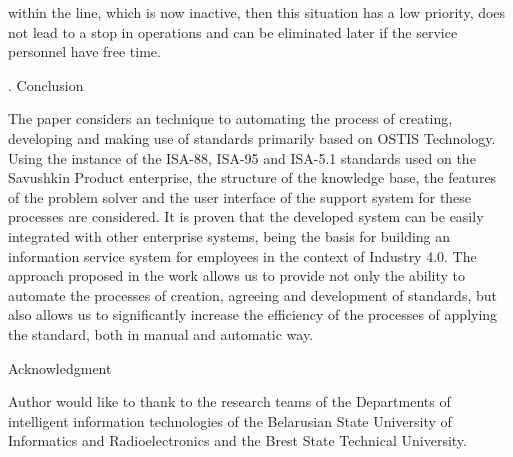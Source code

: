 \documentclass[twocolumn]{scndocument}
\begin{document}
within the line, which is now inactive, then this situation
has a low priority, does not lead to a stop in operations
and can be eliminated later if the service personnel have
free time.

\singlespacing
\begin{center}
\MakeUppercase{}. Conclusion  
\end{center}

The paper considers an technique to automating the
process of creating, developing and making use of standards primarily based on OSTIS Technology. Using the
instance of the ISA-88, ISA-95 and ISA-5.1 standards
used on the Savushkin Product enterprise, the structure
of the knowledge base, the features of the problem solver
and the user interface of the support system for these
processes are considered. It is proven that the developed
system can be easily integrated with other enterprise
systems, being the basis for building an information
service system for employees in the context of Industry
4.0. The approach proposed in the work allows us to
provide not only the ability to automate the processes
of creation, agreeing and development of standards, but
also allows us to significantly increase the efficiency of
the processes of applying the standard, both in manual
and automatic way.

\singlespacing
\begin{center}
    Acknowledgment
\end{center}

Author would like to thank to the research teams of
the Departments of intelligent information technologies
of the Belarusian State University of Informatics and Radioelectronics and the Brest State Technical University.
\end{document}

